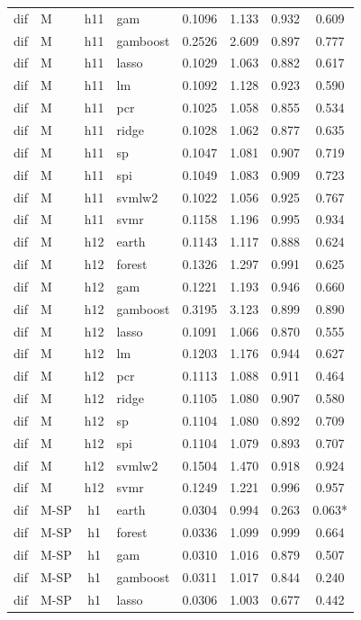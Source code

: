 \begin{ThreePartTable}
\begin{longtable}[t]{llclcccc}
dif & M & h11 & gam & 0.1096 & 1.133 & 0.932 & 0.609\\
dif & M & h11 & gamboost & 0.2526 & 2.609 & 0.897 & 0.777\\
dif & M & h11 & lasso & 0.1029 & 1.063 & 0.882 & 0.617\\
dif & M & h11 & lm & 0.1092 & 1.128 & 0.923 & 0.590\\
dif & M & h11 & pcr & 0.1025 & 1.058 & 0.855 & 0.534\\
dif & M & h11 & ridge & 0.1028 & 1.062 & 0.877 & 0.635\\
dif & M & h11 & sp & 0.1047 & 1.081 & 0.907 & 0.719\\
dif & M & h11 & spi & 0.1049 & 1.083 & 0.909 & 0.723\\
dif & M & h11 & svmlw2 & 0.1022 & 1.056 & 0.925 & 0.767\\
dif & M & h11 & svmr & 0.1158 & 1.196 & 0.995 & 0.934\\
\addlinespace
dif & M & h12 & earth & 0.1143 & 1.117 & 0.888 & 0.624\\
dif & M & h12 & forest & 0.1326 & 1.297 & 0.991 & 0.625\\
dif & M & h12 & gam & 0.1221 & 1.193 & 0.946 & 0.660\\
dif & M & h12 & gamboost & 0.3195 & 3.123 & 0.899 & 0.890\\
dif & M & h12 & lasso & 0.1091 & 1.066 & 0.870 & 0.555\\
dif & M & h12 & lm & 0.1203 & 1.176 & 0.944 & 0.627\\
dif & M & h12 & pcr & 0.1113 & 1.088 & 0.911 & 0.464\\
dif & M & h12 & ridge & 0.1105 & 1.080 & 0.907 & 0.580\\
dif & M & h12 & sp & 0.1104 & 1.080 & 0.892 & 0.709\\
dif & M & h12 & spi & 0.1104 & 1.079 & 0.893 & 0.707\\
dif & M & h12 & svmlw2 & 0.1504 & 1.470 & 0.918 & 0.924\\
dif & M & h12 & svmr & 0.1249 & 1.221 & 0.996 & 0.957\\
\addlinespace
dif & M-SP & h1 & earth & 0.0304 & 0.994 & 0.263 & 0.063*\\
dif & M-SP & h1 & forest & 0.0336 & 1.099 & 0.999 & 0.664\\
dif & M-SP & h1 & gam & 0.0310 & 1.016 & 0.879 & 0.507\\
dif & M-SP & h1 & gamboost & 0.0311 & 1.017 & 0.844 & 0.240\\
dif & M-SP & h1 & lasso & 0.0306 & 1.003 & 0.677 & 0.442\\

\end{longtable}
\end{ThreePartTable}
